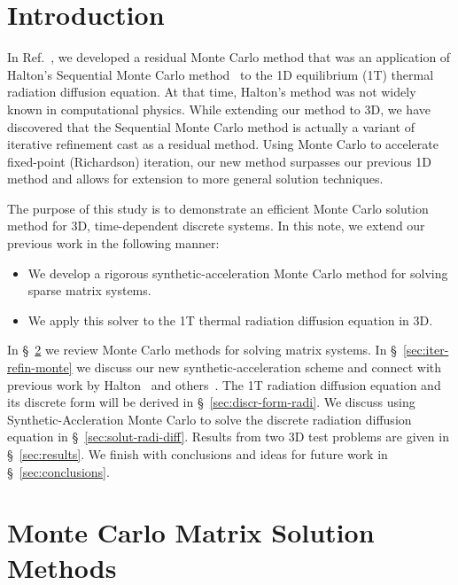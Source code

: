 \documentclass[preprint,12pt]{elsarticle}
\begin{document}

\section{Introduction}
\label{sec:introduction}

In Ref.~\cite{evans_2003}, we developed a residual Monte Carlo method
that was an application of Halton's Sequential Monte Carlo
method~\cite{halton_1962,halton_1994} to the 1D equilibrium (1T)
thermal radiation diffusion equation.  At that time, Halton's method
was not widely known in computational physics.  While extending our
method to 3D, we have discovered that the Sequential Monte Carlo
method is actually a variant of iterative refinement cast as a
residual method.  Using Monte Carlo to accelerate fixed-point
(Richardson) iteration, our new method surpasses our previous 1D
method and allows for extension to more general solution techniques.

The purpose of this study is to demonstrate an efficient Monte Carlo
solution method for 3D, time-dependent discrete systems.  In this
note, we extend our previous work in the following manner:
\begin{itemize}
\item We develop a rigorous synthetic-acceleration Monte Carlo method
  for solving sparse matrix systems.
\item We apply this solver to the 1T thermal radiation diffusion
  equation in 3D.
\end{itemize}
In \S~\ref{sec:monte-carlo-matrix} we review Monte Carlo methods for
solving matrix systems. In \S~\ref{sec:iter-refin-monte} we discuss
our new synthetic-acceleration scheme and connect with previous work
by Halton~\cite{halton_1994} and others~\cite{evans_2003}.  The 1T
radiation diffusion equation and its discrete form will be derived in
\S~\ref{sec:discr-form-radi}.  We discuss using Synthetic-Accleration
Monte Carlo to solve the discrete radiation diffusion equation in
\S~\ref{sec:solut-radi-diff}.  Results from two 3D test problems are
given in \S~\ref{sec:results}.  We finish with conclusions and ideas
for future work in \S~\ref{sec:conclusions}.

\section{Monte Carlo Matrix Solution Methods}
\label{sec:monte-carlo-matrix}
\end{document}
